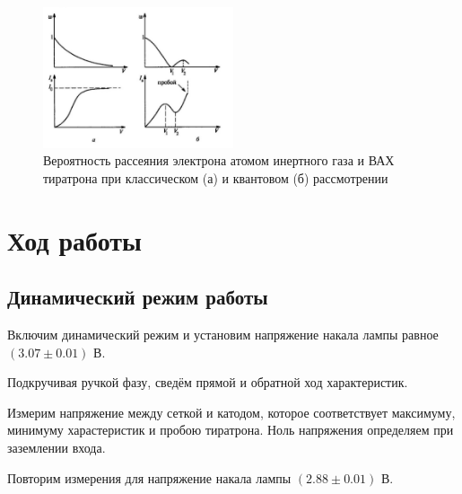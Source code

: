 \documentclass[a4paper, 12pt]{article}
\begin{document}
        \begin{figure}[h!]
            \begin{center}
                \includegraphics[width = 0.5\textwidth]{img/probability.png}
                \caption{Вероятность рассеяния электрона атомом инертного газа и ВАХ тиратрона при классическом (а) и квантовом (б) рассмотрении}
                \label{img:probability}
            \end{center}
        \end{figure}

    \section{Ход работы}

        \subsection{Динамический режим работы}

            Включим динамический режим и установим напряжение накала лампы равное $(3.07 \pm 0.01) \text{ В}$.

            Подкручивая ручкой фазу, сведём прямой и обратной ход характеристик.

            Измерим напряжение между сеткой и катодом, которое соответствует максимуму, минимуму харастеристик и пробою тиратрона. Ноль напряжения определяем при заземлении входа.

            Повторим измерения для напряжение накала лампы $(2.88 \pm 0.01) \text{ В}$.
\end{document}

